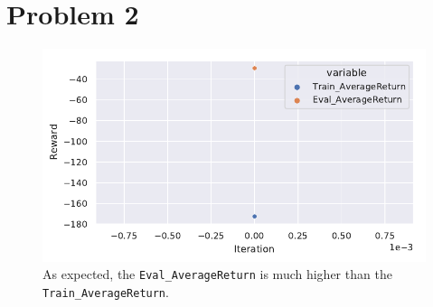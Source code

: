\documentclass[letterpaper, 10pt]{article}
\begin{document}
\section*{Problem 2}

\begin{figure}[h]
	\centering
	\includegraphics{q2.pdf}
	\caption{As expected, the \texttt{Eval\_AverageReturn} is much higher than the \texttt{Train\_AverageReturn}.}
\end{figure}
\end{document}

